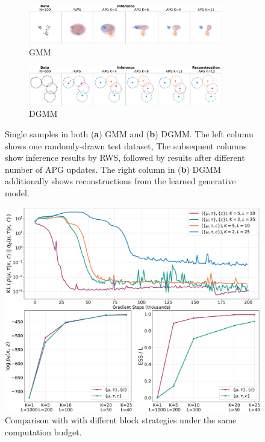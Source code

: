 \documentclass{article}
\theoremstyle{definition}
\begin{document}
\begin{figure}[t!]
  \centering
  \begin{subfigure}[t]{0.5\textwidth}
  \includegraphics[width=85mm]{figures/gmm_samples.pdf}
  \vspace*{-1mm}
  \caption{GMM}
  \label{samples-gmm}
  \vspace{-1ex}
  \end{subfigure}%
  \begin{subfigure}[t]{0.5\textwidth}
  \includegraphics[width=85mm]{figures/dgmm_samples.pdf}
  \vspace*{-1mm}
  \caption{DGMM}
  \label{samples-dgmm}
  \vspace{-1ex}
  \end{subfigure}
  \caption{Single samples in both (\textbf{a}) GMM and (\textbf{b}) DGMM. The left column shows one randomly-drawn test dataset, The subsequent columns show inference results by RWS, followed by results after different number of APG updates. The right column in (\textbf{b}) DGMM additionally shows reconstructions from the learned generative model.}
  \label{samples-mixture}
\end{figure}



\begin{figure}[t!]
\centering
\includegraphics[width=\columnwidth]{figures/gmm_blocks_comparison.pdf}
  \caption{Comparison with with differnt block strategies under the same computation budget.}
  \label{fig:convergence-gmm}
\end{figure}
\end{document}
